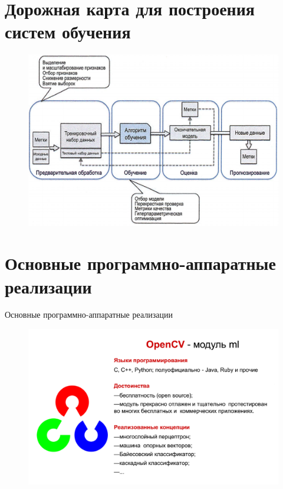 \documentclass{beamer}
\begin{document}
\section{Дорожная карта для построения систем обучения}
\begin{frame}[t]
\begin{figure}[h]
\centering
\includegraphics[scale=0.4]{images/lec01-pic11.png}
\end{figure}
\end{frame}

\section{Основные программно-аппаратные реализации}
\begin{frame}[t]{Основные программно-аппаратные реализации}
\begin{figure}[h]
\centering
\includegraphics[scale=0.35]{images/lec01-pic13.png}
\end{figure}
\end{frame}
\end{document}
